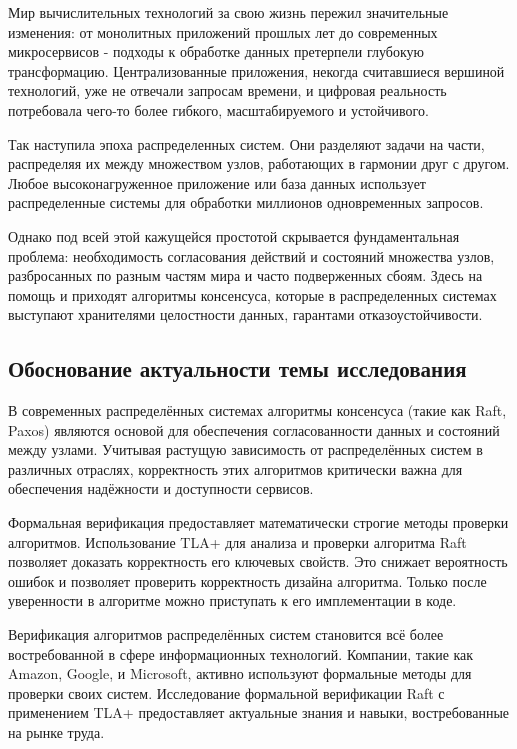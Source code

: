\introduction %

Мир вычислительных технологий за свою жизнь пережил значительные изменения:
от монолитных приложений прошлых лет до современных микросервисов - подходы к
обработке данных претерпели глубокую трансформацию. Централизованные приложения,
некогда считавшиеся вершиной технологий, уже не отвечали запросам времени, и
цифровая реальность потребовала чего-то более гибкого, масштабируемого и
устойчивого.

Так наступила эпоха распределенных систем. Они разделяют задачи на части,
распределяя их между множеством узлов, работающих в гармонии друг с другом.
Любое высоконагруженное приложение или база данных использует распределенные
системы для обработки миллионов одновременных запросов.

Однако под всей этой кажущейся простотой скрывается фундаментальная проблема:
необходимость согласования действий и состояний множества узлов, разбросанных
по разным частям мира и часто подверженных сбоям. Здесь на помощь и приходят
алгоритмы консенсуса, которые в распределенных системах выступают хранителями
целостности данных, гарантами отказоустойчивости.

\subsection*{Обоснование актуальности темы исследования}

В современных распределённых системах алгоритмы консенсуса (такие как Raft,
Paxos) являются основой для обеспечения согласованности данных и состояний
между узлами. Учитывая растущую зависимость от распределённых
систем в различных отраслях, корректность этих алгоритмов критически важна
для обеспечения надёжности и доступности сервисов.

Формальная верификация предоставляет математически строгие методы проверки
алгоритмов. Использование TLA+ для анализа и проверки алгоритма Raft позволяет
доказать корректность его ключевых свойств. Это снижает вероятность ошибок и
позволяет проверить корректность дизайна алгоритма. Только после уверенности
в алгоритме можно приступать к его имплементации в коде.

Верификация алгоритмов распределённых систем становится всё более востребованной
в сфере информационных технологий. Компании, такие как Amazon, Google, и
Microsoft, активно используют формальные методы для проверки своих систем.
Исследование формальной верификации Raft с применением TLA+ предоставляет
актуальные знания и навыки, востребованные на рынке труда.

